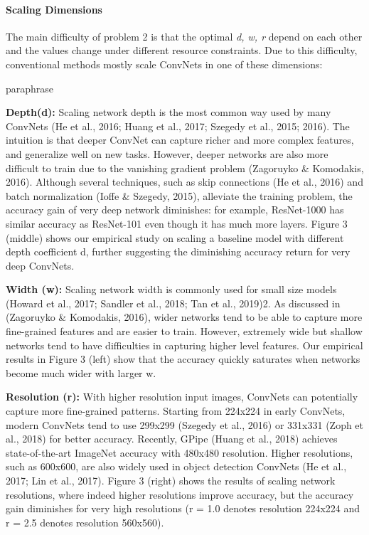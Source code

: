 \documentclass[
]{krantz}
\begin{document}
\hypertarget{scaling-dimensions}{%
\paragraph{Scaling Dimensions}\label{scaling-dimensions}}

The main difficulty of problem 2 is that the optimal \emph{d, w, r} depend on each other and the values change under different resource constraints. Due to this difficulty, conventional methods mostly scale ConvNets in one of these dimensions:

paraphrase

\textbf{Depth(d):} Scaling network depth is the most common way used by many ConvNets (He et al., 2016; Huang et al., 2017; Szegedy et al., 2015; 2016). The intuition is that deeper ConvNet can capture richer and more complex features, and generalize well on new tasks. However, deeper networks are also more difficult to train due to the vanishing gradient problem (Zagoruyko \& Komodakis, 2016). Although several techniques, such as skip connections (He et al., 2016) and batch normalization (Ioffe \& Szegedy, 2015), alleviate the training problem, the accuracy gain of very deep network diminishes: for example, ResNet-1000 has similar accuracy as ResNet-101 even though it has much more layers. Figure 3 (middle) shows our empirical study on scaling a baseline model with different depth coefficient d, further suggesting the diminishing accuracy return for very deep ConvNets.

\textbf{Width (w):} Scaling network width is commonly used for small size models (Howard et al., 2017; Sandler et al., 2018; Tan et al., 2019)2. As discussed in (Zagoruyko \& Komodakis, 2016), wider networks tend to be able to capture more fine-grained features and are easier to train. However, extremely wide but shallow networks tend to have difficulties in capturing higher level features. Our empirical results in Figure 3 (left) show that the accuracy quickly saturates when networks become much wider with larger w.

\textbf{Resolution (r):} With higher resolution input images, ConvNets can potentially capture more fine-grained patterns. Starting from 224x224 in early ConvNets, modern ConvNets tend to use 299x299 (Szegedy et al., 2016) or 331x331 (Zoph et al., 2018) for better accuracy. Recently, GPipe (Huang et al., 2018) achieves state-of-the-art ImageNet accuracy with 480x480 resolution. Higher resolutions, such as 600x600, are also widely used in object detection ConvNets (He et al., 2017; Lin et al., 2017). Figure 3 (right) shows the results of scaling network resolutions, where indeed higher resolutions improve accuracy, but the accuracy gain diminishes for very high resolutions (r = 1.0 denotes resolution 224x224 and r = 2.5 denotes resolution 560x560).
\end{document}
